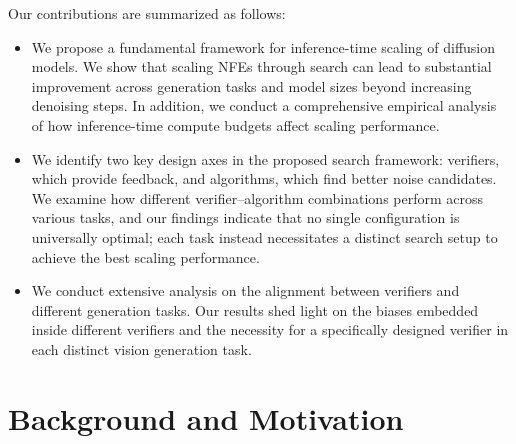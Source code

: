 Our contributions are summarized as follows:
\begin{itemize}
    \item We propose a fundamental framework for inference-time scaling of diffusion models. We show that scaling NFEs through search can lead to substantial improvement across generation tasks and model sizes beyond increasing denoising steps. In addition, we conduct a comprehensive empirical analysis of how inference-time compute budgets affect scaling performance.
    \item We identify two key design axes in the proposed search framework: verifiers, which provide feedback, and algorithms, which find better noise candidates. We examine how different verifier–algorithm combinations perform across various tasks, and our findings indicate that no single configuration is universally optimal; each task instead necessitates a distinct search setup to achieve the best scaling performance.
    \item We conduct extensive analysis on the alignment between verifiers and different generation tasks. Our results shed light on the biases embedded inside different verifiers and the necessity for a specifically designed verifier in each distinct vision generation task.
\end{itemize}




















\vspace{-0.2cm}
\section{Background and Motivation}
\label{sec:background}
\vspace{-0.2cm}



